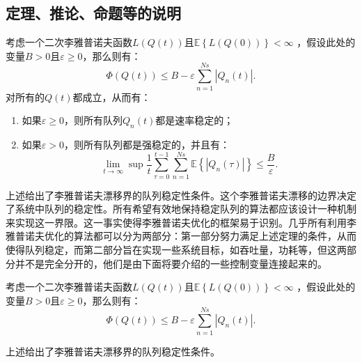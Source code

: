 \subsection{定理、推论、命题等的说明}

\begin{TheoremJXD}\label{Theorem1-1}
{考虑一个二次李雅普诺夫函数$L\left( {Q\left( t \right)} \right)$且$\mathbb{E}\left\{ {L\left( {Q\left( 0 \right)} \right)} \right\} < \infty $ ，假设此处的变量$B > 0$且$\varepsilon  \ge 0$，那么则有：
\begin{equation}\label{Eq1-2}
\Phi \left( {Q\left( t \right)} \right) \le B - \varepsilon \sum\limits_{n = 1}^{Ns} {\left| {{Q_n}\left( t \right)} \right|}.
\end{equation}
对所有的$Q\left( t \right)$都成立，从而有：
\begin{enumerate}
	\item {如果$\varepsilon  \ge 0$，则所有队列${Q_n}\left( t \right)$都是速率稳定的；}
	\item {如果$\varepsilon  > 0$，则所有队列都是强稳定的，并且有：
\begin{equation}\label{Eq1-3}
\mathop {\lim }\limits_{t \to \infty } \sup \frac{1}{t}\sum\limits_{\tau  = 0}^{t - 1} {\sum\limits_{n = 1}^{Ns}\mathbb{E} {\left\{ {\left| {{Q_n}\left( \tau  \right)} \right|} \right\}} }  \le \frac{B}{\varepsilon }.
\end{equation}	
}
\end{enumerate}
}
\end{TheoremJXD}
\vspace{0.5em}
上述给出了李雅普诺夫漂移界的队列稳定性条件。这个李雅普诺夫漂移的边界决定了系统中队列的稳定性。所有希望有效地保持稳定队列的算法都应该设计一种机制来实现这一界限。这一事实使得李雅普诺夫优化的框架易于识别。几乎所有利用李雅普诺夫优化的算法都可以分为两部分：第一部分努力满足上述定理的条件，从而使得队列稳定，而第二部分旨在实现一些系统目标，如吞吐量，功耗等，但这两部分并不是完全分开的，他们是由下面将要介绍的一些控制变量连接起来的。

\begin{LemmaJXD}\label{Lemma1-1}
考虑一个二次李雅普诺夫函数$L\left( {Q\left( t \right)} \right)$且$\mathbb{E}\left\{ {L\left( {Q\left( 0 \right)} \right)} \right\} < \infty $ ，假设此处的变量$B > 0$且$\varepsilon  \ge 0$，那么则有：
\begin{equation}\label{Eq1-4}
\Phi \left( {Q\left( t \right)} \right) \le B - \varepsilon \sum\limits_{n = 1}^{Ns} {\left| {{Q_n}\left( t \right)} \right|}.
\end{equation}
\end{LemmaJXD}
\vspace{0.5em}
上述给出了李雅普诺夫漂移界的队列稳定性条件。


